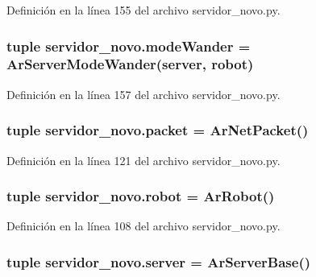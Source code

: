 Definición en la línea 155 del archivo servidor\_\-novo.py.

\hypertarget{namespaceservidor__novo_a1f0f40c9f2b17d9579e189b4ec8f4ffe}{
\subsubsection[{modeWander}]{\setlength{\rightskip}{0pt plus 5cm}tuple {\bf servidor\_\-novo.modeWander} = ArServerModeWander({\bf server}, {\bf robot})}}
\label{namespaceservidor__novo_a1f0f40c9f2b17d9579e189b4ec8f4ffe}


Definición en la línea 157 del archivo servidor\_\-novo.py.

\hypertarget{namespaceservidor__novo_a4644b693a5931c2f1a9d68500534d955}{
\subsubsection[{packet}]{\setlength{\rightskip}{0pt plus 5cm}tuple {\bf servidor\_\-novo.packet} = ArNetPacket()}}
\label{namespaceservidor__novo_a4644b693a5931c2f1a9d68500534d955}


Definición en la línea 121 del archivo servidor\_\-novo.py.

\hypertarget{namespaceservidor__novo_ae604d92f7f5c43d2a993ae9402534424}{
\subsubsection[{robot}]{\setlength{\rightskip}{0pt plus 5cm}tuple {\bf servidor\_\-novo.robot} = ArRobot()}}
\label{namespaceservidor__novo_ae604d92f7f5c43d2a993ae9402534424}


Definición en la línea 108 del archivo servidor\_\-novo.py.

\hypertarget{namespaceservidor__novo_a538b68fbb948f9cf0573a119042c9e0d}{
\subsubsection[{server}]{\setlength{\rightskip}{0pt plus 5cm}tuple {\bf servidor\_\-novo.server} = ArServerBase()}}
\label{namespaceservidor__novo_a538b68fbb948f9cf0573a119042c9e0d}


